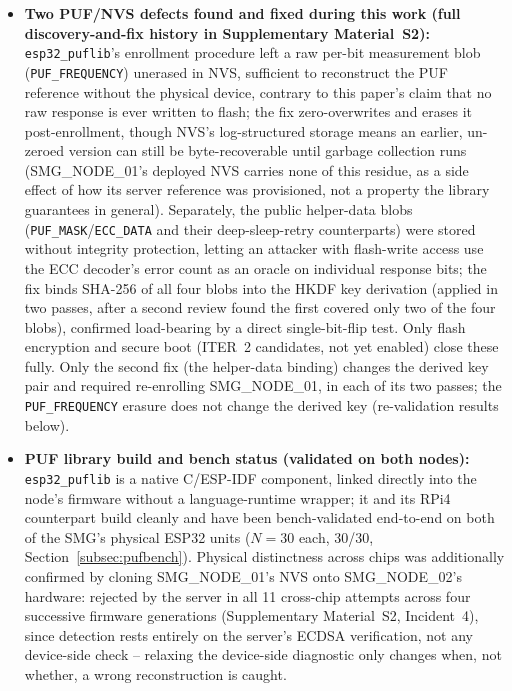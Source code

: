 \documentclass[preprint,12pt,authoryear]{elsarticle}
\begin{document}
\begin{sloppypar}
\begin{itemize}[leftmargin=*]
    \item \textbf{Two PUF/NVS defects found and fixed during this work (full discovery-and-fix history in Supplementary Material~S2):} \texttt{esp32\_puflib}'s enrollment procedure left a raw per-bit measurement blob (\texttt{PUF\_FREQUENCY}) unerased in NVS, sufficient to reconstruct the PUF reference without the physical device, contrary to this paper's claim that no raw response is ever written to flash; the fix zero-overwrites and erases it post-enrollment, though NVS's log-structured storage means an earlier, un-zeroed version can still be byte-recoverable until garbage collection runs (SMG\_NODE\_01's deployed NVS carries none of this residue, as a side effect of how its server reference was provisioned, not a property the library guarantees in general). Separately, the public helper-data blobs (\texttt{PUF\_MASK}/\texttt{ECC\_DATA} and their deep-sleep-retry counterparts) were stored without integrity protection, letting an attacker with flash-write access use the ECC decoder's error count as an oracle on individual response bits; the fix binds SHA-256 of all four blobs into the HKDF key derivation (applied in two passes, after a second review found the first covered only two of the four blobs), confirmed load-bearing by a direct single-bit-flip test. Only flash encryption and secure boot (ITER~2 candidates, not yet enabled) close these fully. Only the second fix (the helper-data binding) changes the derived key pair and required re-enrolling SMG\_NODE\_01, in each of its two passes; the \texttt{PUF\_FREQUENCY} erasure does not change the derived key (re-validation results below).
    \item \textbf{PUF library build and bench status (validated on both nodes):} \texttt{esp32\_puflib} \citep{stanicek2022esp32puflib} is a native C/ESP-IDF component, linked directly into the node's firmware without a language-runtime wrapper; it and its RPi4 counterpart build cleanly and have been bench-validated end-to-end on both of the SMG's physical ESP32 units ($N=30$ each, 30/30, Section~\ref{subsec:pufbench}). Physical distinctness across chips was additionally confirmed by cloning SMG\_NODE\_01's NVS onto SMG\_NODE\_02's hardware: rejected by the server in all 11 cross-chip attempts across four successive firmware generations (Supplementary Material~S2, Incident~4), since detection rests entirely on the server's ECDSA verification, not any device-side check -- relaxing the device-side diagnostic only changes when, not whether, a wrong reconstruction is caught.

\end{itemize}
\end{sloppypar}
\end{document}
